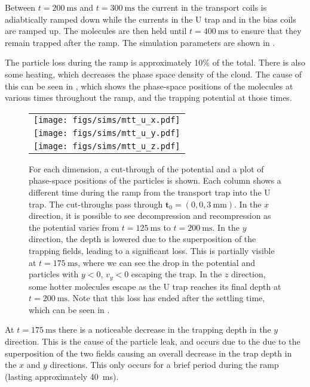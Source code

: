 Between $t=\SI{200}{\milli\second}$ and $t=\SI{300}{\milli\second}$ the current
in the transport coils is adiabtically ramped down while the currents in
the U trap and in the bias coils are ramped up. The molecules are then held
until $t=\SI{400}{\milli\second}$ to ensure that they remain trapped after the
ramp. The simulation parameters are shown in
.

The particle loss during the ramp is approximately 10\% of the total. There is
also some heating, which decreases the phase space density of the cloud. The
cause of this can be seen in , which shows the
phase-space positions of the molecules at various times throughout the ramp,
and the trapping potential at those times.

\begin{figure}[p]
\centering
  \begin{tabular}{c}
    \texttt{[image: figs/sims/mtt\_u\_x.pdf]} \\
    \texttt{[image: figs/sims/mtt\_u\_y.pdf]} \\
    \texttt{[image: figs/sims/mtt\_u\_z.pdf]}
  \end{tabular}
  \caption{
    For each dimension, a cut-through of the potential and a plot of
    phase-space positions of the particles is shown. Each column shows a
    different time during the ramp from the transport trap into the U trap. The
    cut-throughs pass through $\mathbf{t}_0 = (0, 0, \SI{3}{\milli\meter})$. In
    the $x$ direction, it is possible to see decompression and recompression as
    the potential varies from $t=\SI{125}{\milli\second}$ to
    $t=\SI{200}{\milli\second}$. In the $y$ direction, the depth is lowered due
    to the superposition of the trapping fields, leading to a significant loss.
    This is partially visible at $t=\SI{175}{\milli\second}$, where we can see
    the drop in the potential and particles with $y<0$, $v_y<0$ escaping the
    trap. In the $z$ direction, some hotter molecules escape as the U trap
    reaches its final depth at $t=\SI{200}{\milli\second}$. Note that this loss
    has ended after the settling time, which can be seen in
    .
  }
  \label{design:fig:trans_U}
\end{figure}

At $t=\SI{175}{\milli\second}$ there is a noticeable decrease in the trapping
depth in the $y$ direction. This is the cause of the particle leak, and occurs
due to the due to the superposition of the two fields causing an overall
decrease in the trap depth in the $x$ and $y$ directions. This only occurs for
a brief period during the ramp (lasting approximately \SI{40}{\milli\second}). 

